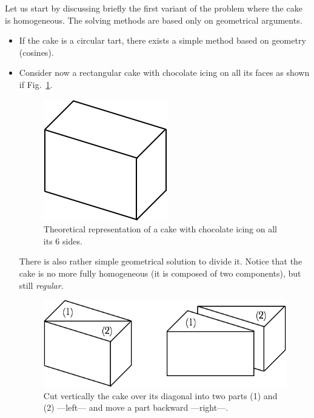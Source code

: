 Let us start by discussing briefly the first variant of the problem where the cake is homogeneous. 
The solving methods are based only on geometrical arguments. 
\begin{itemize}
\item If the cake is a circular tart, there exists a simple method based on geometry (cosines).
\item Consider now a rectangular cake with chocolate icing on all its faces as shown if Fig.~\ref{Fig:cakeHomogeneous1}.
\begin{figure}[htb]
\begin{center}
        \includegraphics[scale=0.4]{FiguresMaths/CakeHomogeneous1}
        \caption{Theoretical representation of a cake with chocolate icing on all its 6 sides.}
        \label{Fig:cakeHomogeneous1}
\end{center}
\end{figure}
There is also rather simple geometrical solution to divide it. 
Notice that the cake is no more fully homogeneous (it is composed of two components), but still \textit{regular}. 
\begin{figure}[htb]
\begin{center}
        \includegraphics[scale=0.4]{FiguresMaths/CakeHomogeneous2}
        \caption{Cut vertically the cake over its diagonal into two parts (1) and (2) ---left--- and move a part backward ---right---.}
        \label{Fig:cakeHomogeneous2}

\end{center}
\end{figure}
\end{itemize}
